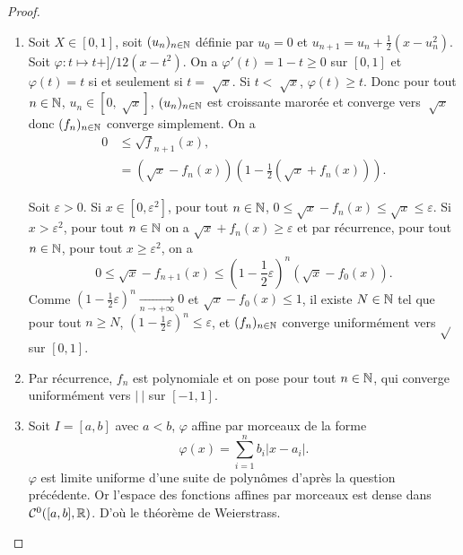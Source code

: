 \documentclass[12pt]{article}
\begin{document}
\begin{proof}
    \phantom{}
    \begin{enumerate}
        \item Soit $X\in[0,1]$, soit $(u_n)_{n\in\mathbb{N}}$ définie par $u_0=0$ et $u_{n+1}=u_n+\frac{1}{2}(x-u_{n}^{2})$. Soit $\varphi\colon t\mapsto t+]/  1   2   (x-t^{2})$. On a $\varphi'(t)=1-t\geqslant0$ sur $[0,1]$ et $\varphi(t)=t$ si et seulement si $t=\sqrt[]{x}$. Si $t<\sqrt[]{x}$, $\varphi(t)\geqslant t$. Donc pour tout $n\in\mathbb{N}$, $u_n\in[0,\sqrt[]{x}]$, $(u_n)_{n\in\mathbb{N}}$ est croissante marorée et converge vers $\sqrt[]{x}$ donc $(f_n)_{n\in\mathbb{N}}$ converge simplement. On a 
        \begin{align*}
            0&\leqslant
            \sqrt{f}_{n+1}(x),\\
            &=
            \left(\sqrt{x}-f_n(x)\right)\left(1-\frac{1}{2}\left(\sqrt{x}+f_n(x)\right)\right).
        \end{align*}

        Soit $\varepsilon>0$. Si $x\in[0,\varepsilon^{2}]$, pour tout $n\in\mathbb{N}$, $0\leqslant\sqrt{x}-f_n(x)\leqslant\sqrt{x}\leqslant\varepsilon$. Si $x>\varepsilon^{2}$, pour tout $n\in\mathbb{N}$ on a $\sqrt{x}+f_n(x)\geqslant \varepsilon$ et  par récurrence, pour tout $n\in\mathbb{N}$, pour tout $x\geqslant\varepsilon^{2}$, on a
        \begin{equation*}
            0\leqslant\sqrt{x}-f_{n+1}(x)\leqslant\left(1-\frac{1}{2}\varepsilon\right)^{n}\left(\sqrt{x}-f_0(x)\right).
        \end{equation*}
        Comme $\left(1-\frac{1}{2}\varepsilon\right)^{n}\xrightarrow[n\to+\infty]{}0$ et $\sqrt{x}-f_0(x)\leqslant 1$, il existe $N\in\mathbb{N}$ tel que pour tout $n\geqslant N$, $\left(1-\frac{1}{2}\varepsilon\right)^{n}\leqslant \varepsilon$, et $(f_n)_{n\in\mathbb{N}}$ converge uniformément vers $\sqrt{}$ sur $[0,1]$.

        \item Par récurrence, $f_n$ est polynomiale et on pose pour tout $n\in\mathbb{N}$, 
        qui converge uniformément vers $\left\lvert~\right\rvert$ sur $[-1,1]$.

        \item Soit $I=[a,b]$ avec $a<b$, $\varphi$ affine par morceaux de la forme 
        \begin{equation*}
            \varphi(x)=\sum_{i=1}^{n}b_i\left\lvert x-a_i\right\rvert.    
        \end{equation*}
        $\varphi$ est limite uniforme d'une suite de polynômes d'après la question précédente. Or l'espace des fonctions affines par morceaux est dense dans $\mathcal{C}^{0}([a,b],\mathbb{R})$. D'où le théorème de Weierstrass.
    \end{enumerate}
\end{proof}
\end{document}

